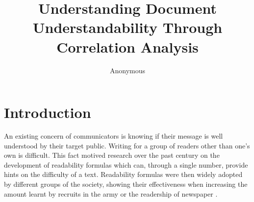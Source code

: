 \documentclass[runningheads,a4paper]{llncs}
\begin{document}
\mainmatter  %

\title{Understanding Document Understandability Through Correlation Analysis}


%
%
\author{Anonymous}
%


%
%

\maketitle


\section{Introduction}
\label{chp:understanding_understandability}

An existing concern of communicators is knowing if their message is well understood by their target public.  
Writing for a group of readers other than one's own is difficult.
This fact motived research over the past century on the development of readability formulas which can, through a single number, provide hints on the difficulty of a text.
Readability formulas were then widely adopted by different groups of the society, showing their effectiveness when increasing the amount learnt by recruits in the army \cite{klare55} or the readership of newspaper \cite{perry54}.
\end{document}
